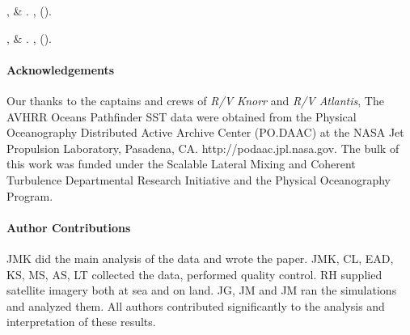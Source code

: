 \documentclass{article}
\begin{document}
\begin{thebibliography}{10}
,  \&
\newblock {}.
\newblock \emph{}
  \textbf{}, 
  ().

,  \&
\newblock {}.
\newblock \emph{}
  \textbf{}, 
  ().

\end{thebibliography}





\clearpage
\listoffigures
\clearpage

\paragraph{Acknowledgements} Our thanks to the captains and crews of \emph{R/V Knorr} and \emph{R/V Atlantis}, The AVHRR Oceans Pathfinder SST data were obtained from the Physical Oceanography Distributed Active Archive Center (PO.DAAC) at the NASA Jet Propulsion Laboratory, Pasadena, CA. http://podaac.jpl.nasa.gov. The bulk of this work was funded under the Scalable Lateral Mixing and Coherent Turbulence Departmental Research Initiative and the Physical Oceanography Program.

\paragraph{Author Contributions} JMK did the main analysis of the data and wrote the paper.  JMK, CL, EAD, KS, MS, AS, LT collected the data, performed quality control. RH supplied satellite imagery both at sea and on land. JG, JM and JM ran the simulations and analyzed them.  All authors contributed significantly to the analysis and interpretation of these results.  
\end{document}
